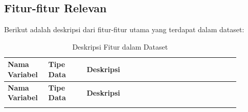 \subsection{Fitur-fitur Relevan}
Berikut adalah deskripsi dari fitur-fitur utama yang terdapat dalam dataset:
\begin{longtable}{|p{0.15\linewidth}|p{0.15\linewidth}|p{0.6\linewidth}|}
    \caption{Deskripsi Fitur dalam Dataset} \\
    \hline
    \textbf{Nama Variabel} & \textbf{Tipe Data} & \textbf{Deskripsi} \\
    \hline
    \endfirsthead

    \hline
    \textbf{Nama Variabel} & \textbf{Tipe Data} & \textbf{Deskripsi} \\
    \hline
    \endhead

    \hline
    \endfoot

    \hline
    \endlastfoot


\end{longtable}
